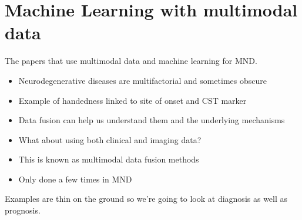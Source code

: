 \section{Machine Learning with multimodal data}

The papers that use multimodal data and machine learning for MND.
\begin{itemize}
    \item Neurodegenerative diseases are multifactorial and sometimes obscure
    \item Example of handedness linked to site of onset and CST marker
    \item Data fusion can help us understand them and the underlying mechanisms
    \item What about using both clinical and imaging data?
    \item This is known as multimodal data fusion methods
    \item Only done a few times in MND
\end{itemize}

Examples are thin on the ground so we're going to look at diagnosis as well as prognosis.



